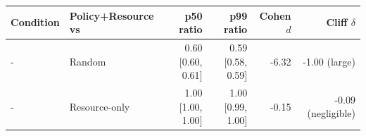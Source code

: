 \begin{tabular}{llrrrr}
\toprule
Condition & Policy+Resource vs & p50 ratio & p99 ratio & Cohen $d$ & Cliff $\delta$ \\
\midrule
- & Random & 0.60 [0.60, 0.61] & 0.59 [0.58, 0.59] & -6.32 & -1.00 (large) \\
- & Resource-only & 1.00 [1.00, 1.00] & 1.00 [0.99, 1.00] & -0.15 & -0.09 (negligible) \\
\bottomrule
\end{tabular}
